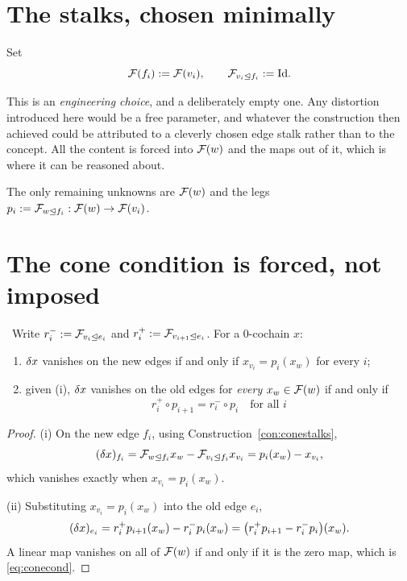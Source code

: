\section{The stalks, chosen minimally}

\begin{construction}\label{con:conestalks}
Set
\[
  \mathcal{F}(f_i):=\mathcal{F}(v_i),
  \qquad
  \mathcal{F}_{v_i\trianglelefteq f_i}:=\mathrm{Id} .
\]
\end{construction}

\begin{hon}\Hon
This is an \emph{engineering choice}, and a deliberately empty one. Any
distortion introduced here would be a free parameter, and whatever the
construction then achieved could be attributed to a cleverly chosen edge
stalk rather than to the concept. All the content is forced into
$\mathcal{F}(w)$ and the maps out of it, which is where it can be reasoned
about.
\end{hon}

The only remaining unknowns are $\mathcal{F}(w)$ and the legs
$p_i:=\mathcal{F}_{w\trianglelefteq f_i}:\mathcal{F}(w)\to\mathcal{F}(v_i)$.

\section{The cone condition is forced, not imposed}

\begin{proposition}\label{prop:conecond}
\Proved\ Write $r_i^-:=\mathcal{F}_{v_i\trianglelefteq e_i}$ and
$r_i^+:=\mathcal{F}_{v_{i+1}\trianglelefteq e_i}$. For a $0$-cochain $x$:
\begin{enumerate}[label=(\roman*)]
  \item $\delta x$ vanishes on the new edges if and only if
        $x_{v_i}=p_i(x_w)$ for every $i$;
  \item given (i), $\delta x$ vanishes on the old edges for
        \emph{every} $x_w\in\mathcal{F}(w)$ if and only if
        \begin{equation}\label{eq:conecond}
          \boxed{\ r_i^+\circ p_{i+1}=r_i^-\circ p_i
          \quad\text{for all }i\ }
        \end{equation}
\end{enumerate}
\end{proposition}
\begin{proof}
(i) On the new edge $f_i$, using
Construction~\ref{con:conestalks},
\[
  (\delta x)_{f_i}
  =\mathcal{F}_{w\trianglelefteq f_i}x_w-\mathcal{F}_{v_i\trianglelefteq f_i}x_{v_i}
  =p_i(x_w)-x_{v_i},
\]
which vanishes exactly when $x_{v_i}=p_i(x_w)$.

(ii) Substituting $x_{v_i}=p_i(x_w)$ into the old edge $e_i$,
\[
  (\delta x)_{e_i}=r_i^+p_{i+1}(x_w)-r_i^-p_i(x_w)
  =\bigl(r_i^+p_{i+1}-r_i^-p_i\bigr)(x_w).
\]
A linear map vanishes on all of $\mathcal{F}(w)$ if and only if it is the
zero map, which is \eqref{eq:conecond}.
\end{proof}

